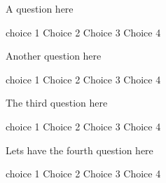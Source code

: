 \documentclass[11pt, a4page, answers]{exam}   %
\begin{document}
\begin{questions}

\question[2] A question here
\begin{choices}
  \choice choice 1
  \choice Choice 2
  \CorrectChoice Choice 3
  \choice Choice 4
\end{choices}

\question[2] Another question here
\begin{choices}
  \choice choice 1
  \choice Choice 2
  \CorrectChoice Choice 3
  \choice Choice 4
\end{choices}

\question[2] The third question here
\begin{choices}
  \choice choice 1
  \choice Choice 2
  \CorrectChoice Choice 3
  \choice Choice 4
\end{choices}

\question[2] Lets have the fourth question here
\begin{choices}
  \choice choice 1
  \choice Choice 2
  \CorrectChoice Choice 3
  \choice Choice 4
\end{choices}

\end{questions}
\end{document}
